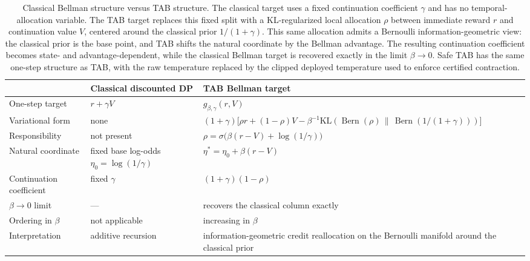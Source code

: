 \documentclass{article}
\theoremstyle{remark}
\DeclareMathOperator{\Bern}{Bern}
\newcommand{\KL}{\mathrm{KL}}
\newcommand{\gbg}{g_{\beta,\gamma}}
\newcommand{\KLbin}[2]{\KL\!\left(\Bern(#1)\,\middle\|\,\Bern(#2)\right)}
\begin{document}
\begin{table}[h!]
\centering
\small
\begingroup
\renewcommand{\arraystretch}{1.1}
\caption{Classical Bellman structure versus TAB structure. The classical target uses a fixed continuation coefficient $\gamma$ and has no temporal-allocation variable. The TAB target replaces this fixed split with a KL-regularized local allocation $\rho$ between immediate reward $r$ and continuation value $V$, centered around the classical prior $1/(1+\gamma)$. This same allocation admits a Bernoulli information-geometric view: the classical prior is the base point, and TAB shifts the natural coordinate by the Bellman advantage. The resulting continuation coefficient becomes state- and advantage-dependent, while the classical Bellman target is recovered exactly in the limit $\beta\to 0$. Safe TAB has the same one-step structure as TAB, with the raw temperature replaced by the clipped deployed temperature used to enforce certified contraction.}
\label{tab:bellman-comparison}
\begin{tabularx}{\textwidth}{
@{}
>{\raggedright\arraybackslash}p{}
>{\raggedright\arraybackslash}p{}
>{\raggedright\arraybackslash}X
@{}}
\toprule
 & Classical discounted DP & TAB Bellman target \\
\midrule
One-step target
& $r+\gamma V$
& $\gbg(r,V)$ \\
\addlinespace[0.15em]

Variational form
& none
& $(1+\gamma)\bigl[\rho r +(1-\rho)V - \beta^{-1}\KLbin{\rho}{1/(1+\gamma)}\bigr]$ \\
\addlinespace[0.15em]

Responsibility
& not present
& $\rho=\sigma\bigl(\beta(r-V)+\log(1/\gamma)\bigr)$ \\
\addlinespace[0.15em]

Natural coordinate
& fixed base log-odds $\eta_0=\log(1/\gamma)$
& $\eta^*=\eta_0+\beta(r-V)$ \\
\addlinespace[0.15em]

Continuation coefficient
& fixed $\gamma$
& $(1+\gamma)(1-\rho)$ \\
\addlinespace[0.15em]

$\beta\to 0$ limit
& ---
& recovers the classical column exactly \\
\addlinespace[0.15em]

Ordering in $\beta$
& not applicable
& increasing in $\beta$ \\
\addlinespace[0.15em]

Interpretation
& additive recursion
& information-geometric credit reallocation on the Bernoulli manifold around the classical prior \\
\bottomrule
\end{tabularx}
\endgroup
\end{table}
\end{document}
